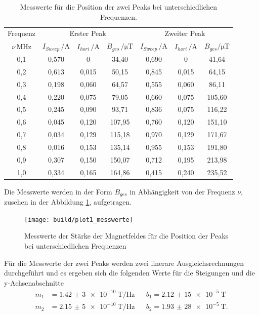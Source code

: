 \begin{table}
\centering
\caption{Messwerte für die Position der zwei Peaks bei unterschiedlichen Frequenzen.}
\label{tab:messwerte}
\begin{tabular}{c| c c c | c c c }
\toprule
Frequenz & \multicolumn{3}{c}{Erster Peak} & \multicolumn{3}{c}{Zweiter Peak} \\
$\nu \, \si{\mega\hertz}$  & $I_{Sweep} \, \si{\per\ampere}$ &   $I_{hori} \, \si{\per\ampere}$ &  $B_{ges} \, \si{\per\micro\tesla}$ & $I_{Sweep} \, \si{\per\ampere}$
&   $I_{hori} \, \si{\per\ampere} $ & $ B_{ges} \si{\per\micro\tesla}$\\
\midrule
0,1 & 0,570 &  0       & 34,40  & 0,690 & 0      &   41,64 \\
0,2 & 0,613 &  0,015   & 50,15  & 0,845 & 0,015  &   64,15 \\
0,3 & 0,198 &  0,060   & 64,57  & 0,555 & 0,060  &   86,11 \\
0,4 & 0,220 &  0,075   & 79,05  & 0,660 & 0,075  &  105,60 \\
0,5 & 0,245 &  0,090   & 93,71  & 0,836 & 0,075  &  116,22 \\
0,6 & 0,045 &  0,120   & 107,95 & 0,760 & 0,120  &  151,10 \\
0,7 & 0,034 &  0,129   & 115,18 & 0,970 & 0,129  &  171,67 \\
0,8 & 0,016 &  0,153   & 135,14 & 0,955 & 0,153  &  191,80 \\
0,9 & 0,307 &  0,150   & 150,07 & 0,712 & 0,195  &  213,98 \\
1,0 & 0,334 &  0,165   & 164,86 & 0,415 & 0,240  &  235,52 \\
\bottomrule
\end{tabular}
\end{table}

Die Messwerte werden in der Form $B_{ges}$ in Abhängigkeit von der Frequenz $\nu$,
zusehen in der Abbildung \ref{fig:mess}, aufgetragen.

\begin{figure}
  \centering
  \texttt{[image: build/plot1\_messwerte]}
  \caption{Messwerte der Stärke der Magnetfeldes für die Position der Peaks bei unterschiedlichen Frequenzen}
  \label{fig:mess}
\end{figure}

Für die Messwerte der zwei Peaks werden zwei linerare Ausgleichsrechnungen
durchgeführt und es ergeben sich die folgenden Werte für die Steigungen und die y-Achsenabschnitte
\begin{align*}
  m_1&= \SI{1,42(3)e-10}{\tesla\per\hertz}&    &b_1=\SI{2,12(15)e-5}{\tesla}\\
  m_2&= \SI{2,15(5)e-10}{\tesla\per\hertz}&    &b_2=\SI{1,93(28)e-5}{\tesla}.
\end{align*}

